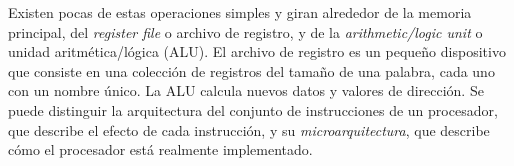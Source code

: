 \begin{itemize}
Existen pocas de estas operaciones simples y giran alrededor de la memoria principal, del \textit{register file} o archivo de registro, y de la \textit{arithmetic/logic unit} o unidad aritmética/lógica (ALU). El archivo de registro es un pequeño dispositivo que consiste en una colección de registros del tamaño de una palabra, cada uno con un nombre único. La ALU calcula nuevos datos y valores de dirección. Se puede distinguir la arquitectura del conjunto de instrucciones de un procesador, que describe el efecto de cada instrucción, y su \textit{microarquitectura}, que describe cómo el procesador está realmente implementado.
\end{itemize}

